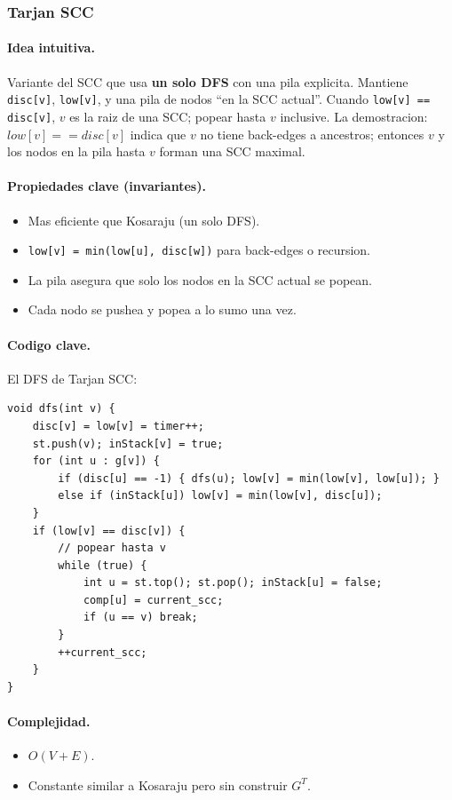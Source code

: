 ﻿\subsubsection{Tarjan SCC}

\paragraph{Idea intuitiva.}
Variante del SCC que usa \textbf{un solo DFS} con una pila explicita. Mantiene \texttt{disc[v]}, \texttt{low[v]}, y una pila de nodos ``en la SCC actual''. Cuando \texttt{low[v] == disc[v]}, $v$ es la raiz de una SCC; popear hasta $v$ inclusive. La demostracion: $low[v] == disc[v]$ indica que $v$ no tiene back-edges a ancestros; entonces $v$ y los nodos en la pila hasta $v$ forman una SCC maximal.

\paragraph{Propiedades clave (invariantes).}
\begin{itemize}\setlength\itemsep{0pt}
	\item Mas eficiente que Kosaraju (un solo DFS).
	\item \texttt{low[v] = min(low[u], disc[w])} para back-edges o recursion.
	\item La pila asegura que solo los nodos en la SCC actual se popean.
	\item Cada nodo se pushea y popea a lo sumo una vez.
\end{itemize}

\paragraph{Codigo clave.}
El DFS de Tarjan SCC:
\begin{verbatim}
void dfs(int v) {
    disc[v] = low[v] = timer++;
    st.push(v); inStack[v] = true;
    for (int u : g[v]) {
        if (disc[u] == -1) { dfs(u); low[v] = min(low[v], low[u]); }
        else if (inStack[u]) low[v] = min(low[v], disc[u]);
    }
    if (low[v] == disc[v]) {
        // popear hasta v
        while (true) {
            int u = st.top(); st.pop(); inStack[u] = false;
            comp[u] = current_scc;
            if (u == v) break;
        }
        ++current_scc;
    }
}
\end{verbatim}

\paragraph{Complejidad.}
\begin{itemize}\setlength\itemsep{0pt}
	\item $O(V + E)$.
	\item Constante similar a Kosaraju pero sin construir $G^T$.
\end{itemize}

